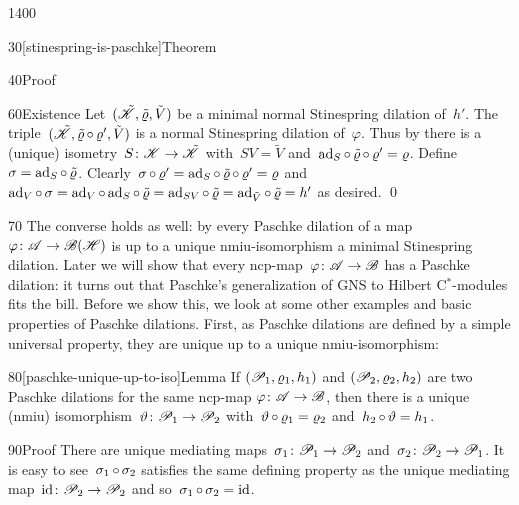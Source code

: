 \begin{parsec}{1400}
\begin{point}{30}[stinespring-is-paschke]{Theorem}
\begin{point}{40}{Proof}
\begin{point}{60}{Existence}%
Let~$(\tilde{\mathscr{K}}, \tilde\varrho, \tilde V)$
be a minimal normal Stinespring dilation of~$h'$.
The triple~$(\tilde{\mathscr{K}}, \tilde\varrho \mathop{\circ} \varrho', \tilde V)$
is a normal Stinespring dilation of~$\varphi$.
Thus by 
    there is a (unique) isometry~$S \colon \mathscr{K} \to \tilde{\mathscr{K}}$
    with~$SV = \tilde V$
    and~$\mathrm{ad}_S \mathop{\circ} \tilde\varrho \mathop{\circ} \varrho' = \varrho$.
Define~$\sigma = \mathrm{ad}_S \mathop{\circ} \tilde\varrho$.
Clearly~$\sigma \mathop{\circ} \varrho' = \mathrm{ad}_S \mathop{\circ} \tilde\varrho \mathop{\circ} \varrho'
    = \varrho$
    and~$\mathrm{ad}_V \mathop{\circ} \sigma =
        \mathrm{ad}_V \mathop{\circ} \mathrm{ad}_S \mathop{\circ} \tilde\varrho
        = \mathrm{ad}_{SV} \mathop{\circ} \tilde\varrho
        = \mathrm{ad}_{\tilde V} \mathop{\circ} \tilde\varrho = h'$
        as desired. \qed
\end{point}
\par
\end{point}
\spacingfix{}
\begin{point}{70}%
The converse holds as well:
    by 
    every Paschke dilation of a map~$\varphi \colon \mathscr{A} \to \mathscr{B}(\mathscr{H})$
    is up to a unique nmiu-isomorphism a minimal Stinespring dilation.
Later we will show that
    every ncp-map~$\varphi\colon \mathscr{A} \to \mathscr{B}$
    has a Paschke dilation:
    it turns out that Paschke's generalization of
    GNS to Hilbert C$^*$-modules fits the bill.
Before we show this,
    we look at some other examples and basic properties
        of Paschke dilations.
First, as Paschke dilations are defined by a simple universal property,
    they are unique up to a unique nmiu-isomorphism:
\par
\end{point}
\end{point}
\spacingfix{}
\begin{point}{80}[paschke-unique-up-to-iso]{Lemma}%
If $(\mathscr{P}_1, \varrho_1, h_1)$
and $(\mathscr{P}_2, \varrho_2, h_2)$
    are two Paschke dilations for 
    the same ncp-map $\varphi\colon \mathscr{A} \to \mathscr{B}$,
    then there is a unique (nmiu)
    isomorphism~$\vartheta \colon \mathscr{P}_1 \to \mathscr{P}_2$
    with~$\vartheta \mathop{\circ} \varrho_1 = \varrho_2$
    and~$h_2 \mathop{\circ} \vartheta = h_1$.
\begin{point}{90}{Proof}%
There are unique mediating maps~$\sigma_1\colon \mathscr{P}_1 \to \mathscr{P}_2$
and~$\sigma_2 \colon \mathscr{P}_2 \to \mathscr{P}_1$.
It is easy to see~$\sigma_1 \mathop{\circ} \sigma_2$
satisfies the same defining property
as the unique mediating map~$\mathrm{id}\colon \mathscr{P}_2 \to \mathscr{P}_2$
and so~$\sigma_1 \mathop{\circ} \sigma_2 = \mathrm{id}$.

\end{point}
\end{point}
\end{parsec}
